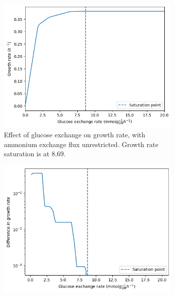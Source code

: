 \begin{figure}
  \centering
  \begin{subfigure}[t]{0.45\textwidth}
  \centering
    \includegraphics[width=\linewidth]{saturation_glc}
    \caption{
      Effect of glucose exchange on growth rate, with ammonium exchange flux unrestricted.
      Growth rate saturation is at \SI{8.69}{\mmolgdwh}.
    }
    \label{fig:model-saturation-glucose}
  \end{subfigure}%
  \begin{subfigure}[t]{0.45\textwidth}
  \centering
    \includegraphics[width=\linewidth]{saturation_diff_glc}
    \caption{
    }
    \label{fig:model-saturation-diff-glucose}
  \end{subfigure}


\end{figure}
